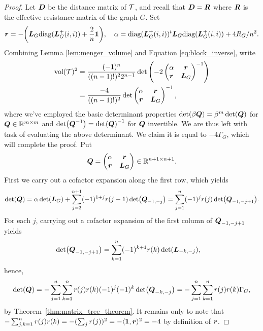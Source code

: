 \begin{proof}
	Let $\vb*{D}$ be the distance matrix of $\mathcal{T}$, and recall that $\vb*{D}=\vb*{R}$ where $\vb*{R}$ is the effective resistance matrix of the graph $G$. 
	Set \[\vb*{r}=-\bigg(\vb*{L}_G\text{diag}(\vb*{L}_G^+(i,i)) + \frac{2}{n}\vb{1}\bigg), \quad \alpha = \text{diag}(\vb*{L}_G^+(i,i))^t \vb*{L}_G\text{diag}(\vb*{L}_G^+(i,i)) + 4R_G/n^2.\] 
	Combining Lemma \ref{lem:menger_volume} and Equation \ref{eq:block_inverse}, write 
	\begin{align*}
	\textnormal{vol}(\mathcal{T})^2 &= \frac{(-1)^n }{((n-1)!)^2 2^{n-1}} \det\left(-2\begin{pmatrix}
	\alpha & \vb*{r} \\
	\vb*{r} & \vb*{L}_G
	\end{pmatrix}^{-1}\right) \\
	&= \frac{ -4}{((n-1)!)^2}\det\begin{pmatrix}
	\alpha & \vb*{r} \\
	\vb*{r} & \vb*{L}_G
	\end{pmatrix}^{-1},
	\end{align*}
	where we've employed the basic determinant properties $\det( \beta\vb*{Q})=\beta^{m}\det(\vb*{Q})$ for $\vb*{Q}\in\mathbb{R}^{m\times m}$ and $\det(\vb*{Q}^{-1})=\det(\vb*{Q})^{-1}$ for $\vb*{Q}$ invertible. We are thus left with task of evaluating the above determinant. We claim it is equal to $-4\Gamma_G$,  which will complete the proof. 
	Put 
	\[\vb*{Q} = \begin{pmatrix}
	\alpha & \vb*{r}\\ \vb*{r}& \vb*{L}_G
	\end{pmatrix}\in\mathbb{R}^{n+1\times n+1}.\]
	First we carry out a cofactor expansion along the first row, which yields 
	\begin{align*}
	\det(\vb*{Q}) = \alpha \det(\vb*{L}_G) + \sum_{j=2}^{n+1}(-1)^{1+j}r({j-1}) \det(\vb*{Q}_{-1,-j}) = \sum_{j=1}^n (-1)^j r(j) \det(\vb*{Q}_{-1,-j+1}).
	\end{align*}
	For each $j$, carrying out a cofactor expansion of the first column of $\vb*{Q}_{-1,-j+1}$ yields 
	\begin{align*}
	\det(\vb*{Q}_{-1,-j+1}) &= \sum_{k=1}^n (-1)^{k+1}r(k) \det(\vb*{L}_{-k,-j}),
	\end{align*}
	hence, 
	\begin{align*}
	\det(\vb*{Q}) = - \sum_{j=1}^n \sum_{k=1}^n r(j)r(k)(-1)^j(-1)^k  \det(\vb*{Q}_{-k,-j}) = - \sum_{j=1}^n \sum_{k=1}^n r(j)r(k)\Gamma_G,
	\end{align*}
	by Theorem~\ref{thm:matrix_tree_theorem}. It remains only to note that 
	$-\sum_{j,k=1}^n r(j) r(k) = -(\sum_j r(j))^2 = - \langle \vb{1},\vb*{r}\rangle ^2 = - 4$ 
	by  definition  of $\vb*{r}$. 
\end{proof}


